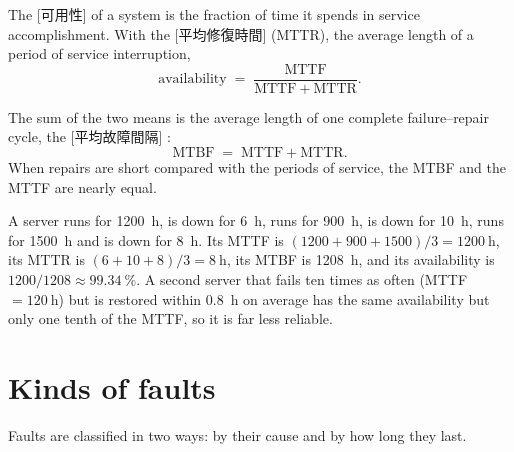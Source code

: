 \documentclass[../main.tex]{subfiles}
\begin{document}
\begin{definition}[Availability]
  The [可用性] of a system is the fraction of time it
  spends in service accomplishment.  With the [平均修復時間] (MTTR), the
  average length of a period of service interruption,
  \begin{equation}
    \text{availability} \;=\; \frac{\mathrm{MTTF}}{\mathrm{MTTF}+\mathrm{MTTR}} .
    \label{eq:l17-availability}
  \end{equation}
\end{definition}

The sum of the two means is the average length of one complete
failure--repair cycle, the [平均故障間隔]%
:
\begin{equation}
  \mathrm{MTBF} \;=\; \mathrm{MTTF} + \mathrm{MTTR} .
  \label{eq:l17-mtbf}
\end{equation}
When repairs are short compared with the periods of service, the MTBF and
the MTTF are nearly equal.

\begin{example}
  \label{ex:l17-availability}
  A server runs for \SI{1200}{\hour}, is down for \SI{6}{\hour}, runs for
  \SI{900}{\hour}, is down for \SI{10}{\hour}, runs for \SI{1500}{\hour} and is
  down for \SI{8}{\hour}.  Its MTTF is $(1200+900+1500)/3 = \SI{1200}{\hour}$,
  its MTTR is $(6+10+8)/3 = \SI{8}{\hour}$, its MTBF is \SI{1208}{\hour}, and
  its availability is $1200/1208 \approx \SI{99.34}{\percent}$.  A second
  server that fails ten times as often (MTTF $=\SI{120}{\hour}$) but is
  restored within \SI{0.8}{\hour} on average has the same availability but
  only one tenth of the MTTF, so it is far less reliable.
\end{example}

\section{Kinds of faults}
\label{sec:l17-kinds}

Faults are classified in two ways: by their cause and by how long they
last.
\end{document}
